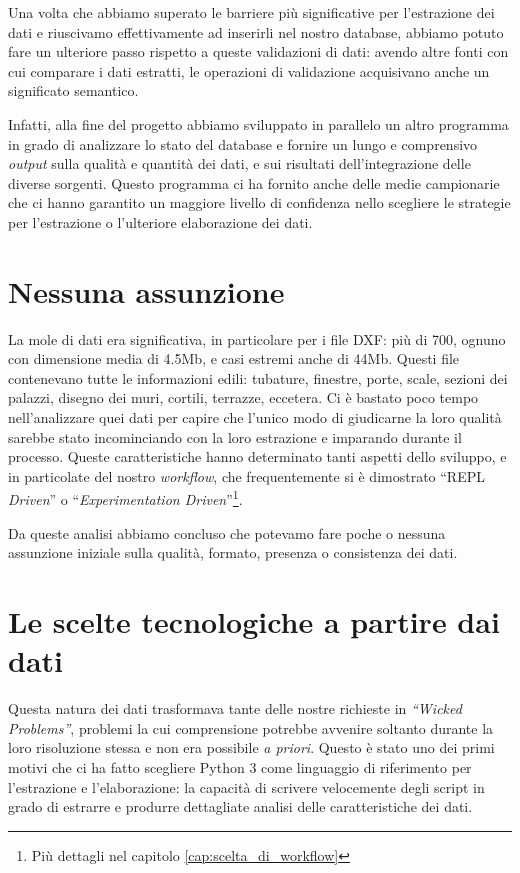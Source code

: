 \documentclass[12pt]{report}
\begin{document}
Una volta che abbiamo superato le barriere più significative per l'estrazione 
dei dati e riuscivamo effettivamente ad inserirli nel nostro 
database, abbiamo potuto fare un ulteriore passo rispetto a 
queste validazioni di dati: avendo altre fonti con cui comparare i dati
estratti, le operazioni di validazione acquisivano anche un significato
semantico. 

Infatti, alla fine del progetto abbiamo sviluppato in parallelo
un altro programma in grado di analizzare lo stato del database 
e fornire un lungo e comprensivo \textit{output} sulla 
qualità e quantità dei dati, e sui risultati dell'integrazione delle 
diverse sorgenti. Questo programma ci ha fornito anche delle medie campionarie che ci hanno 
garantito un maggiore livello di confidenza nello scegliere le
strategie per l'estrazione o l'ulteriore elaborazione dei dati.

\section*{Nessuna assunzione}

La mole di dati era significativa, in particolare per i file DXF: più di
700, ognuno con dimensione media di 4.5Mb, e casi estremi anche di
44Mb. Questi file contenevano tutte le informazioni edili: tubature,
finestre, porte, scale, sezioni dei palazzi, disegno dei muri,
cortili, terrazze, eccetera. Ci è bastato poco tempo nell'analizzare quei
dati per capire che l'unico modo di giudicarne la loro qualità sarebbe
stato incominciando con la loro estrazione e imparando durante il
processo. Queste caratteristiche hanno determinato tanti aspetti dello
sviluppo, e in particolate del nostro \textit{workflow}, che frequentemente si è
dimostrato ``REPL \textit{Driven}'' o ``\textit{Experimentation
Driven}''\footnote{Più dettagli nel capitolo \ref{cap:scelta_di_workflow}}. 

Da queste analisi abbiamo concluso che potevamo fare poche o nessuna
assunzione iniziale sulla qualità, formato, presenza o consistenza dei dati.

\section{Le scelte tecnologiche a partire dai dati}

Questa natura dei dati trasformava tante delle nostre richieste in
\textit{``Wicked Problems''}, problemi la cui comprensione potrebbe
avvenire soltanto durante la loro risoluzione stessa e non era
possibile \textit{a priori}. Questo è stato uno dei primi motivi che
ci ha fatto scegliere Python 3 come linguaggio di riferimento per
l'estrazione e l'elaborazione: la capacità di scrivere velocemente
degli script in grado di estrarre e produrre dettagliate analisi delle
caratteristiche dei dati. 
\end{document}
